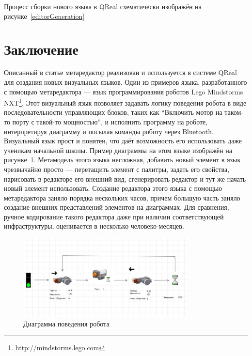 \documentclass[a4paper]{article}
\begin{document}
Процесс сборки нового языка в QReal схематически изображён на рисунке~\ref{editorGeneration}

\section{Заключение}
Описанный в статье метаредактор реализован и используется в системе QReal для создания новых визуальных языков. Один из примеров языка, разработанного с помощью метаредактора --- язык программирования роботов Lego Mindstorms NXT\footnote{http://mindstorms.lego.com}. Этот визуальный язык позволяет задавать логику поведения робота в виде последовательности управляющих блоков, таких как ``Включить мотор на таком-то порту с такой-то мощностью'', и исполнить программу на роботе, интерпретируя диаграмму и посылая команды роботу через Bluetooth. Визуальный язык прост и понятен, что даёт возможность его использовать даже ученикам начальной школы. Пример диаграммы на этом языке изображён на рисунке~\ref{robotsDiagram}. Метамодель этого языка несложная, добавить новый элемент в язык чрезвычайно просто --- перетащить элемент с палитры, задать его свойства, нарисовать в редакторе его внешний вид, сгенерировать редактор и тут же начать новый элемент использовать. Создание редактора этого языка с помощью метаредактора заняло порядка нескольких часов, причем большую часть заняло создание внешних представлений элементов на диаграммах. Для сравнения, ручное кодирование такого редактора даже при наличии соответствующей инфраструктуры, оценивается в несколько человеко-месяцев.

\begin{figure} [ht]
  \begin{center}
    \includegraphics[width=0.8\textwidth]{robotsDiagram.jpg}
    \caption{Диаграмма поведения робота}
    \label{robotsDiagram}
  \end{center}
\end{figure}

\end{document}
